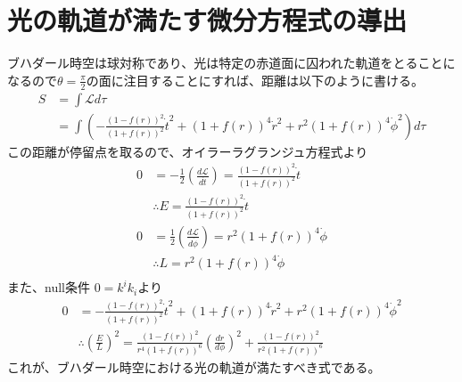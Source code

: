 \documentclass[dvipdfmx]{report} %
\begin{document}
\section{光の軌道が満たす微分方程式の導出}
ブハダール時空は球対称であり、光は特定の赤道面に囚われた軌道をとることになるので$\theta = \frac{\pi}{2}$の面に注目することにすれば、距離は以下のように書ける。
\begin{equation*}
\begin{split}
	S  &= \int \mathcal{L} d\tau \\
	&=  \int \left(
			- \frac{(1 - f(r))^2}{(1 + f(r))^2} \dot{t}^2
			+ (1 + f(r))^4 \dot{r}^2
			+ r^2(1 + f(r))^4 \dot{\phi}^2
		\right) d\tau
\end{split}
\end{equation*}
この距離が停留点を取るので、オイラーラグランジュ方程式より
\begin{equation*}
\begin{split}
	0 &
		= - \frac{1}{2}\left( \frac{d\mathcal{L}}{d\dot{t}} \right)
		= \frac{ (1 - f(r))^2 }{(1 + f(r))^2} \dot{t}\\
	&\therefore  E = \frac{(1 - f(r))^2 }{(1 + f(r))^2} \dot{t}\\
	0 &
		= \frac{1}{2}\left( \frac{d\mathcal{L}}{d\dot{\phi}} \right)
		= r^2 (1 + f(r))^4  \dot{\phi}\\
	&\therefore  L = r^2 (1 + f(r))^4  \dot{\phi}\\
\end{split}
\end{equation*}
また、null条件 $0=k^ik_i$より
\begin{equation*}
\begin{split}
	0 &=
		- \frac{(1 - f(r))^2}{(1 + f(r))^2} \dot{t}^2
		+ (1 + f(r))^4 \dot{r}^2
		+ r^2(1 + f(r))^4 \dot{\phi}^2\\
	& \therefore 
		\left( \frac{E}{L} \right)^2 =
			\frac{(1 - f(r))^2}{r^4 (1 + f(r))^6} \left( \frac{dr}{d\phi} \right)^2
			+ \frac{(1 - f(r))^2}{r^2 (1 + f(r))^6}
\end{split}
\end{equation*}
これが、ブハダール時空における光の軌道が満たすべき式である。
\end{document}

